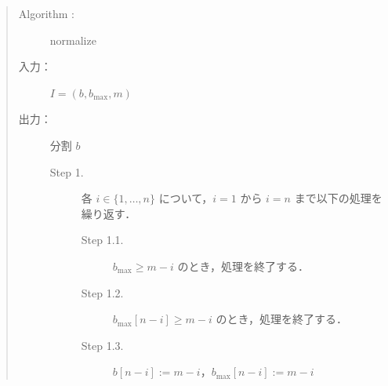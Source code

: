 \documentclass[12pt]{optlab-bachelor}
\begin{document}

\begin{quote}
  \begin{description}
    \item[{\sc Algorithm : }]  {\sc normalize}
    \item[入力：] $I = (b, b_{\max}, m)$
    \item[出力：] 分割 $b$
    \begin{description}
      \item[Step 1.] 各 $i \in \{1,\ldots,n\}$ について，$i = 1$ から $i = n$ まで以下の処理を繰り返す．
      \begin{description}
        \item[Step 1.1.] $b_{\max} \ge m - i$ のとき，処理を終了する．
        \item[Step 1.2.] $b_{\max}[n - i] \ge m - i$ のとき，処理を終了する．
        \item[Step 1.3.] $b[n - i] := m - i$，$b_{\max}[n - i] := m - i$
      \end{description}
    \end{description}
  \end{description}
\end{quote}
\end{document}
